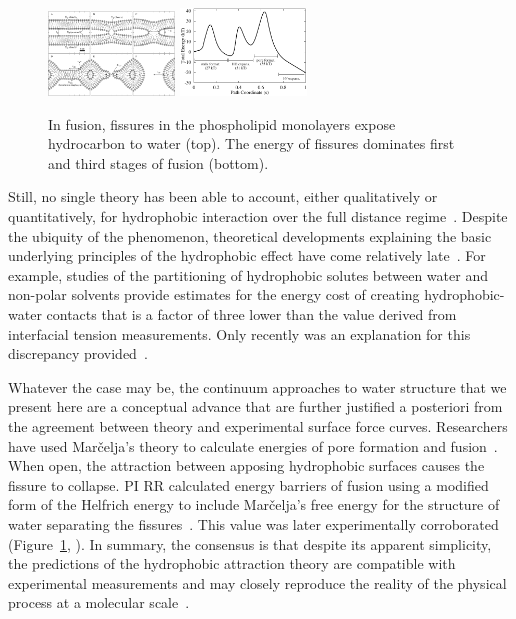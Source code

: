 \begin{figure}
  \vspace{-12pt}
\includegraphics[width=0.3\textwidth]{figures/Background/Fissure.pdf}
\includegraphics[width=0.3\textwidth]{figures/Background/Landscape.pdf}
\caption{\label{fig:fissure} In fusion, fissures in the phospholipid
  monolayers expose hydrocarbon to water (top). The energy of fissures
  dominates first and third stages of fusion (bottom).
}
\end{figure}
Still, no single theory has been able to account, either qualitatively
or quantitatively, for hydrophobic interaction over the full distance
regime~\cite{Lin2005, Meyer2006, Ducker2016}. Despite the ubiquity of
the phenomenon, theoretical developments explaining the basic underlying
principles of the hydrophobic effect have come relatively
late~\cite{Ch05}. For example, studies of the partitioning of
hydrophobic solutes between water and non-polar solvents provide
estimates for the energy cost of creating hydrophobic-water contacts
that is a factor of three lower than the value derived from interfacial
tension measurements. Only recently was an explanation for this
discrepancy provided~\cite{Jackson2016}.

Whatever the case may be, the continuum approaches to water structure
that we present here are a conceptual advance that are further justified
a posteriori from the agreement between theory and experimental surface
force curves. Researchers have used Mar\v{c}elja's theory to calculate
energies of pore formation and fusion~\cite{Gletal88, Aketal17,
RyKlYaCo16}. When open, the attraction between apposing hydrophobic
surfaces causes the fissure to collapse. PI RR calculated energy
barriers of fusion using a modified form of the Helfrich energy to
include Mar\v{c}elja's free energy for the structure of water separating
the fissures~\cite{RyKlYaCo16}. This value was later experimentally
corroborated (Figure~\ref{fig:fissure}, \cite{FrRoPi17}). In summary,
the consensus is that despite its apparent simplicity, the predictions
of the hydrophobic attraction theory are compatible with experimental
measurements and may closely reproduce the reality of the physical
process at a molecular scale~\cite{FrRoPi17, Fretal21}.

